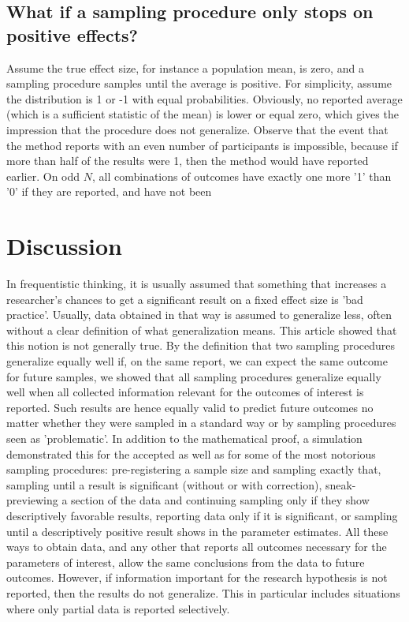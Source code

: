 \documentclass[man]{apa7}\usepackage[]{graphicx}\usepackage[]{xcolor}
\theoremstyle{definition}
\begin{document}
\subsection{What if a sampling procedure only stops on positive effects?}
Assume the true effect size, for instance a population mean, is zero, and a sampling procedure samples until the average is positive. For simplicity, assume the distribution is 1 or -1 with equal probabilities. Obviously, no reported average (which is a sufficient statistic of the mean) is lower or equal zero, which gives the impression that the procedure does not generalize. Observe that the event that the method reports with an even number of participants is impossible, because if more than half of the results were 1, then the method would have reported earlier. On odd $N$, all combinations of outcomes have exactly one more '1' than '0' if they are reported, and have not been %

\section{Discussion}
In frequentistic thinking, it is usually assumed that something that increases a researcher's chances to get a significant result on a fixed effect size is 'bad practice'. Usually, data obtained in that way is assumed to generalize less, often without a clear definition of what generalization means. This article showed that this notion is not generally true. By the definition that two sampling procedures generalize equally well if, on the same report, we can expect the same outcome for future samples, we showed that all sampling procedures generalize equally well when all collected information relevant for the outcomes of interest is reported. Such results are hence equally valid to predict future outcomes no matter whether they were sampled in a standard way or by sampling procedures seen as 'problematic'. In addition to the mathematical proof, a simulation demonstrated this for the accepted as well as for some of the most notorious sampling procedures: pre-registering a sample size and sampling exactly that, sampling until a result is significant (without or with correction), sneak-previewing a section of the data and continuing sampling only if they show descriptively favorable results, reporting data only if it is significant, or sampling until a descriptively positive result shows in the parameter estimates. All these ways to obtain data, and any other that reports all outcomes necessary for the parameters of interest, allow the same conclusions from the data to future outcomes. However, if information important for the research hypothesis is not reported, then the results do not generalize. This in particular includes situations where only partial data is reported selectively.
\end{document}
